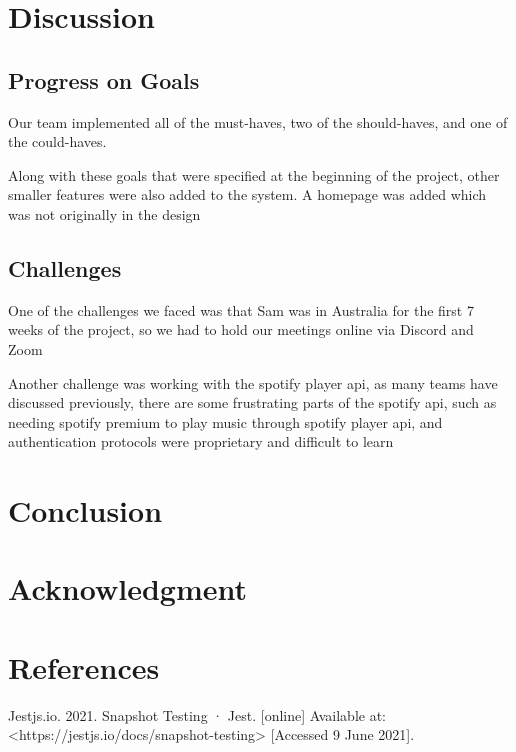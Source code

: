 \documentclass[conference]{IEEEtran}
\begin{document}
\section{Discussion}

\subsection{Progress on Goals}
Our team implemented all of the must-haves, two of the should-haves, and one of the could-haves. 

Along with these goals that were specified at the beginning of the project, other smaller features were also added to the system. A homepage was added which was not originally in the design


\subsection{Challenges}
One of the challenges we faced was that Sam was in Australia for the first 7 weeks of the project, so we had to hold our meetings online via Discord and Zoom

Another challenge was working with the spotify player api, as many teams have discussed previously, there are some frustrating parts of the spotify api, such as needing spotify premium to play music through spotify player api, and authentication protocols were proprietary and difficult to learn


\section{Conclusion}


\section*{Acknowledgment}

\section*{References}


\begin{thebibliography}{00}
Jestjs.io. 2021. Snapshot Testing · Jest. [online] Available at: <https://jestjs.io/docs/snapshot-testing> [Accessed 9 June 2021].
\end{thebibliography}
\end{document}
